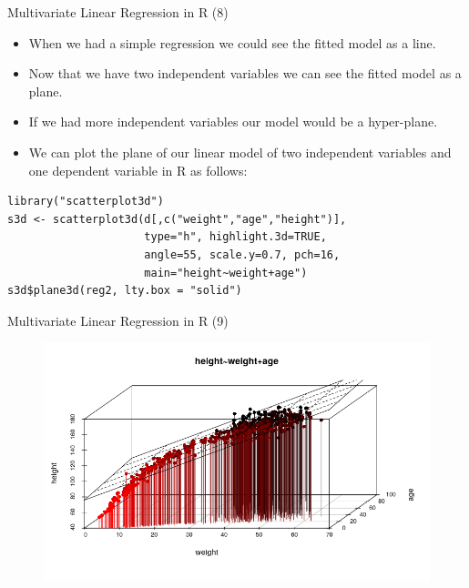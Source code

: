 \documentclass[handout]{beamer}
\begin{document}
\begin{frame}[fragile]{Multivariate Linear Regression in R (8)}
\scriptsize{
\begin{itemize}
 \item When we had a simple regression we could see the fitted model as a line.
 \item Now that we have two independent variables we can see the fitted model as a plane.
 \item If we had more independent variables our model would be a hyper-plane.
 \item We can plot the plane of our linear model of two independent variables and one dependent variable in R as follows:
 \end{itemize}

\begin{verbatim}
library("scatterplot3d")
s3d <- scatterplot3d(d[,c("weight","age","height")],
                     type="h", highlight.3d=TRUE,
                     angle=55, scale.y=0.7, pch=16, 
                     main="height~weight+age")
s3d$plane3d(reg2, lty.box = "solid")
\end{verbatim}




} 
\end{frame}

\begin{frame}{Multivariate Linear Regression in R (9)}
 
\begin{figure}[h!]
  \centering
  \includegraphics[scale=0.55]{pics/reg3d.png}
\end{figure}
 
\end{frame}
\end{document}
